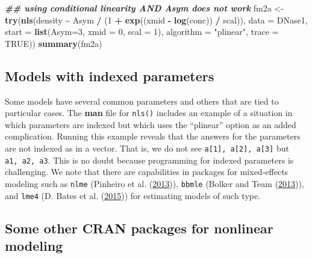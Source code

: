 \documentclass[
]{article}
\newenvironment{Shaded}{\begin{snugshade}}{\end{snugshade}}
\newcommand{\AttributeTok}[1]{\textcolor[rgb]{0.13,0.29,0.53}{#1}}
\newcommand{\ConstantTok}[1]{\textcolor[rgb]{0.56,0.35,0.01}{#1}}
\newcommand{\DecValTok}[1]{\textcolor[rgb]{0.00,0.00,0.81}{#1}}
\newcommand{\DocumentationTok}[1]{\textcolor[rgb]{0.56,0.35,0.01}{\textbf{\textit{#1}}}}
\newcommand{\FunctionTok}[1]{\textcolor[rgb]{0.13,0.29,0.53}{\textbf{#1}}}
\newcommand{\NormalTok}[1]{#1}
\newcommand{\OtherTok}[1]{\textcolor[rgb]{0.56,0.35,0.01}{#1}}
\newcommand{\SpecialCharTok}[1]{\textcolor[rgb]{0.81,0.36,0.00}{\textbf{#1}}}
\newcommand{\StringTok}[1]{\textcolor[rgb]{0.31,0.60,0.02}{#1}}
\begin{document}
\begin{Shaded}
\begin{Highlighting}[]
\DocumentationTok{\#\# using conditional linearity AND Asym does not work}
\NormalTok{fm2a }\OtherTok{\textless{}{-}} \FunctionTok{try}\NormalTok{(}\FunctionTok{nls}\NormalTok{(density }\SpecialCharTok{\textasciitilde{}}\NormalTok{ Asym }\SpecialCharTok{/}\NormalTok{ (}\DecValTok{1} \SpecialCharTok{+} \FunctionTok{exp}\NormalTok{((xmid }\SpecialCharTok{{-}} \FunctionTok{log}\NormalTok{(conc)) }\SpecialCharTok{/}\NormalTok{ scal)), }
                 \AttributeTok{data =}\NormalTok{ DNase1, }\AttributeTok{start =} \FunctionTok{list}\NormalTok{(}\AttributeTok{Asym=}\DecValTok{3}\NormalTok{, }\AttributeTok{xmid =} \DecValTok{0}\NormalTok{, }\AttributeTok{scal =} \DecValTok{1}\NormalTok{),}
                 \AttributeTok{algorithm =} \StringTok{"plinear"}\NormalTok{, }\AttributeTok{trace =} \ConstantTok{TRUE}\NormalTok{))}
\FunctionTok{summary}\NormalTok{(fm2a)}
\end{Highlighting}
\end{Shaded}

\hypertarget{models-with-indexed-parameters}{%
\subsection{Models with indexed
parameters}\label{models-with-indexed-parameters}}

Some models have several common parameters and others that are tied to
particular cases. The \textbf{man} file for \texttt{nls()} includes an
example of a situation in which parameters are indexed but which uses
the ``plinear'' option as an added complication. Running this example
reveals that the answers for the parameters are not indexed as in a
vector. That is, we do not see \texttt{a{[}1{]},\ a{[}2{]},\ a{[}3{]}}
but \texttt{a1,\ a2,\ a3}. This is no doubt because programming for
indexed parameters is challenging. We note that there are capabilities
in packages for mixed-effects modeling such as \texttt{nlme} (Pinheiro
et al. (\protect\hyperlink{ref-p-nlme}{2013})), \texttt{bbmle} (Bolker
and Team (\protect\hyperlink{ref-p-bbmle}{2013})), and \texttt{lme4} (D.
Bates et al. (\protect\hyperlink{ref-p-lme4}{2015})) for estimating
models of such type.

\hypertarget{some-other-cran-packages-for-nonlinear-modeling}{%
\subsection{Some other CRAN packages for nonlinear
modeling}\label{some-other-cran-packages-for-nonlinear-modeling}}
\end{document}

